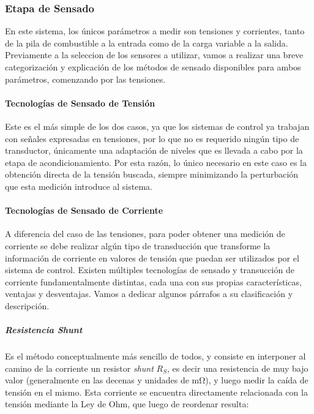\subsubsection{Etapa de Sensado}

En este sistema, los únicos parámetros a medir son tensiones y corrientes, tanto de la pila de combustible a la entrada como de la carga variable a la salida. Previamente a la seleccion de los sensores a utilizar, vamos a realizar una breve categorización y explicación de los métodos de sensado disponibles para ambos parámetros, comenzando por las tensiones.\\

\paragraph{Tecnologías de Sensado de Tensión}

Este es el más simple de los dos casos, ya que los sistemas de control ya trabajan con señales expresadas en tensiones, por lo que no es requerido ningún tipo de transductor, únicamente una adaptación de niveles que es llevada a cabo por la etapa de acondicionamiento. Por esta razón, lo único necesario en este caso es la obtención directa de la tensión buscada, siempre minimizando la perturbación que esta medición introduce al sistema.\\

\paragraph{Tecnologías de Sensado de Corriente}

A diferencia del caso de las tensiones, para poder obtener una medición de corriente se debe realizar algún tipo de transducción que transforme la información de corriente en valores de tensión que puedan ser utilizados por el sistema de control. Existen múltiples tecnologías de sensado y transucción de corriente fundamentalmente distintas, cada una con sus propias características, ventajas y desventajas. Vamos a dedicar algunos párrafos a su clasificación y descripción.\\

\subparagraph{Resistencia Shunt}

Es el método conceptualmente más sencillo de todos, y consiste en interponer al camino de la corriente un resistor \textit{shunt} $R_S$, es decir una resistencia de muy bajo valor (generalmente en las decenas y unidades de \unit{\milli\ohm}), y luego medir la caída de tensión en el mismo. Esta corriente se encuentra directamente relacionada con la tensión mediante la Ley de Ohm, que luego de reordenar resulta:

